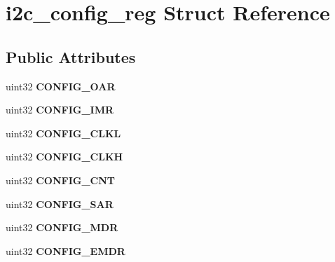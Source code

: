 \hypertarget{structi2c__config__reg}{}\section{i2c\+\_\+config\+\_\+reg Struct Reference}
\label{structi2c__config__reg}
\subsection*{Public Attributes}
\begin{DoxyCompactItemize}
\item 
\mbox{\label{structi2c__config__reg_a99b0ae6c628c51e8e809c0a7eacab555}} 
uint32 {\bfseries C\+O\+N\+F\+I\+G\+\_\+\+O\+AR}
\item 
\mbox{\label{structi2c__config__reg_aa3758d85f5e2ff959dfd195c2b25bcbb}} 
uint32 {\bfseries C\+O\+N\+F\+I\+G\+\_\+\+I\+MR}
\item 
\mbox{\label{structi2c__config__reg_a355b04b7c79dc3d41c13793950b2ca26}} 
uint32 {\bfseries C\+O\+N\+F\+I\+G\+\_\+\+C\+L\+KL}
\item 
\mbox{\label{structi2c__config__reg_ab451ef6ff5a59c7fb6522994d5f49530}} 
uint32 {\bfseries C\+O\+N\+F\+I\+G\+\_\+\+C\+L\+KH}
\item 
\mbox{\label{structi2c__config__reg_aedee93605331fb324b3287526c36923d}} 
uint32 {\bfseries C\+O\+N\+F\+I\+G\+\_\+\+C\+NT}
\item 
\mbox{\label{structi2c__config__reg_aad2eaa2c1717e11d71268fef948f1268}} 
uint32 {\bfseries C\+O\+N\+F\+I\+G\+\_\+\+S\+AR}
\item 
\mbox{\label{structi2c__config__reg_a0638b8ae7fb29cc5bde5502901acada5}} 
uint32 {\bfseries C\+O\+N\+F\+I\+G\+\_\+\+M\+DR}
\item 
\mbox{\label{structi2c__config__reg_ad0a68dae6ce68f7704d460adc98b62f2}} 
uint32 {\bfseries C\+O\+N\+F\+I\+G\+\_\+\+E\+M\+DR}
\item 
\mbox{\label{structi2c__config__reg_a4794f5b4d802159e8a7cc7c38557af55}} 

\end{DoxyCompactItemize}
